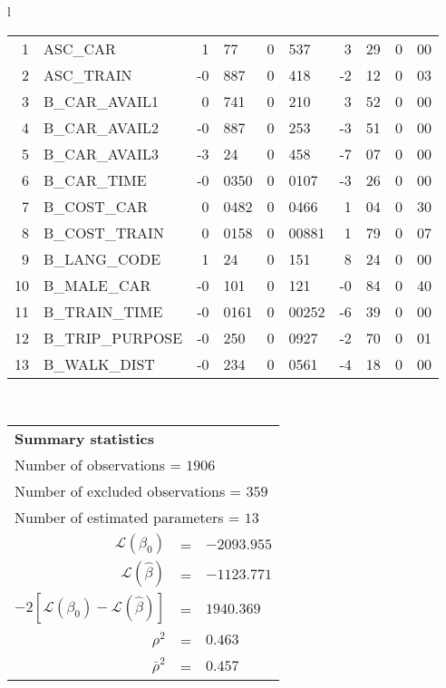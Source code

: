 \begin{tabular}{l}
\begin{tabular}{rlr@{.}lr@{.}lr@{.}lr@{.}l}
1 & ASC_CAR & 1&77 & 0&537 & 3&29 & 0&00\\
2 & ASC_TRAIN & -0&887 & 0&418 & -2&12 & 0&03\\
3 & B_CAR_AVAIL1 & 0&741 & 0&210 & 3&52 & 0&00\\
4 & B_CAR_AVAIL2 & -0&887 & 0&253 & -3&51 & 0&00\\
5 & B_CAR_AVAIL3 & -3&24 & 0&458 & -7&07 & 0&00\\
6 & B_CAR_TIME & -0&0350 & 0&0107 & -3&26 & 0&00\\
7 & B_COST_CAR & 0&0482 & 0&0466 & 1&04 & 0&30\\
8 & B_COST_TRAIN & 0&0158 & 0&00881 & 1&79 & 0&07\\
9 & B_LANG_CODE & 1&24 & 0&151 & 8&24 & 0&00\\
10 & B_MALE_CAR & -0&101 & 0&121 & -0&84 & 0&40\\
11 & B_TRAIN_TIME & -0&0161 & 0&00252 & -6&39 & 0&00\\
12 & B_TRIP_PURPOSE & -0&250 & 0&0927 & -2&70 & 0&01\\
13 & B_WALK_DIST & -0&234 & 0&0561 & -4&18 & 0&00\\
\hline
\end{tabular}
\\
\begin{tabular}{rcl}
\multicolumn{3}{l}{\bf Summary statistics}\\
\multicolumn{3}{l}{ Number of observations = $1906$} \\
\multicolumn{3}{l}{ Number of excluded observations = $359$} \\
\multicolumn{3}{l}{ Number of estimated  parameters = $13$} \\
 $\mathcal{L}(\beta_0)$ &=&  $-2093.955$ \\
 $\mathcal{L}(\hat{\beta})$ &=& $-1123.771 $  \\
 $-2[\mathcal{L}(\beta_0) -\mathcal{L}(\hat{\beta})]$ &=& $1940.369$ \\
    $\rho^2$ &=&   $0.463$ \\
    $\bar{\rho}^2$ &=&    $0.457$ \\
\end{tabular}
  \end{tabular}
